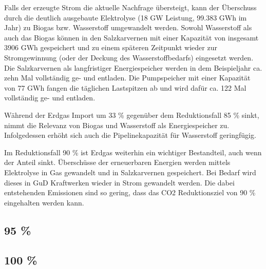 
Falls der erzeugte Strom die aktuelle Nachfrage übersteigt, kann der Überschuss durch die deutlich ausgebaute Elektrolyse (18 GW Leistung, 99.383 GWh im Jahr) zu Biogas bzw. Wasserstoff umgewandelt werden. Sowohl Wasserstoff als auch das Biogas können in den Salzkarvernen mit einer Kapazität von insgesamt 3906 GWh gespeichert und zu einem späteren Zeitpunkt wieder zur Stromgewinnung (oder der Deckung des Wasserstoffbedarfs) eingesetzt werden. Die Salzkarvernen als langfristiger Energiespeicher werden in dem Beispieljahr ca. zehn Mal vollständig ge- und entladen. Die Pumpspeicher mit einer Kapazität von 77 GWh fangen die täglichen Lastspitzen ab und wird dafür ca. 122 Mal vollständig ge- und entladen.

Während der Erdgas Import um 33 \% gegenüber dem Reduktionsfall 85 \% sinkt, nimmt die Relevanz von Biogas und Wasserstoff als Energiespeicher zu. Infolgedessen erhöht sich auch die Pipelinekapazität für Wasserstoff geringfügig. 

Im Reduktionsfall 90 \% ist Erdgas weiterhin ein wichtiger Bestandteil, auch wenn der Anteil sinkt. Überschüsse der erneuerbaren Energien werden mittels Elektrolyse in Gas gewandelt und in Salzkarvernen gespeichert. Bei Bedarf wird dieses in GuD Kraftwerken wieder in Strom gewandelt werden. Die dabei entstehenden Emissionen sind so gering, dass das CO2 Reduktionsziel von 90 \% eingehalten werden kann. 

\subsection{95 \%}

\subsection{100 \%}
%